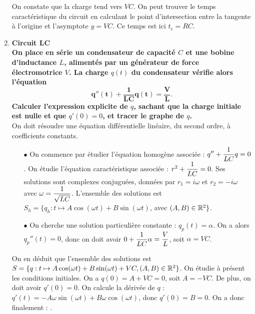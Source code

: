 \documentclass[a4paper, 11pt,reqno]{article}
\begin{document}
\begin{correction}
\begin{enumerate}
\begin{center}
            \hspace*{0.5cm} \begin{minipage}[c]{0.95\linewidth}
              On constate que la charge tend vers $VC$. On peut trouver le temps caract\'eristique du circuit en calculant le point d'intersection entre la tangente \`a l'origine et l'asymptote $y=VC$. Ce temps est ici $t_c = RC$.
            \end{minipage}
          \end{center}
    \item \textbf{Circuit LC}\\
          \textbf{On place en s\'erie un condensateur de capacit\'e $C$ et une bobine d'inductance $L$, aliment\'es par un g\'en\'erateur de force \'electromotrice $V$. La charge $q(t)$ du condensateur v\'erifie alors l'\'equation}
          $$\mathbf{q''(t) + \frac{1}{LC} q(t) = \frac{V}{L}.}$$
          \textbf{Calculer l'expression explicite de $q$, sachant que la charge initiale est nulle et que $q'(0)=0$, et tracer le graphe de $q$.}\\
          On doit r\'esoudre une \'equation diff\'erentielle lin\'eaire, du second ordre, \`a coefficients constants. \\
          \begin{itemize}
            \item[$\bullet$] On commence par \'etudier l'\'equation homog\`ene associ\'ee : $\displaystyle q'' + \frac{1}{LC} q = 0$. On \'etudie l'\'equation caract\'eristique associ\'ee : $r^2 + \displaystyle \frac{1}{LC}=0$. Ses solutions sont complexes conjugu\'ees, donn\'ees par $r_1= i\omega$ et $r_2=-i\omega$ avec  $\omega=\displaystyle \frac{1}{\sqrt{LC}}$. L'ensemble des solutions est $ S_h = \{ q_h : t \mapsto A \cos(\omega t) + B \sin(\omega t)$, avec $(A,B) \in \mathbb{R}^2\}$.
            \item[$\bullet$] On cherche une solution particuli\`ere constante : $q_p(t) = \alpha$. On a alors $q_p''(t) = 0$, donc on doit avoir $0 +\displaystyle \frac{1}{LC} \alpha = \frac{V}{L}$, soit $\alpha = VC$.
          \end{itemize}
          On en d\'eduit que l'ensemble des solutions est $S=\{q : t \mapsto  A \cos(\omega t) + B \sin(\omega t) + VC, (A,B) \in \mathbb{R}^2\}$. On \'etudie \`a pr\'esent les conditions initiales. On a $q(0) = A+VC = 0$, soit $A= -VC$. De plus, on doit avoir $q'(0)=0$. On calcule la d\'eriv\'ee de $q$ : $q'(t) = - A \omega \sin(\omega t) + B \omega \cos(\omega t)$, donc $q'(0) = B = 0$. On a donc finalement : .
          \begin{center}
            \begin{minipage}[c]{0.45\linewidth}


\end{minipage}
\end{center}
\end{enumerate}
\end{correction}
\end{document}
